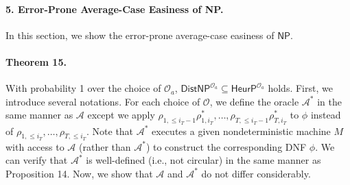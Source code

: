 \documentclass[10pt,a4paper]{article}
\begin{document}
\paragraph{5. Error-Prone Average-Case Easiness of NP.}
In this section, we show the error-prone average-case easiness of $\mathsf{NP}$.
\paragraph{Theorem 15.}
With probability 1 over the choice of $\mathcal O_a$, $\mathsf{DistNP}^{\mathcal O_a}\subseteq\mathsf{HeurP}^{\mathcal O_a}$ holds.
First, we introduce several notations. For each choice of $\mathcal O$, we define the oracle $\mathcal A^*$ in the same manner as $\mathcal A$ except we apply $\rho_{1,\leq i_T-1}\rho^*_{1,i_T},\ldots,\rho_{T,\leq i_T-1}\rho^*_{T,i_T}$ to $\phi$ instead of $\rho_{1,\leq i_T},\ldots,\rho_{T,\leq i_T}$. Note that $\mathcal A^*$ executes a given nondeterministic machine $M$ with access to $\mathcal A$ (rather than $\mathcal A^*$) to construct the corresponding DNF $\phi$. We can verify that $\mathcal A^*$ is well-defined (i.e., not circular) in the same manner as Proposition 14.
Now, we show that $\mathcal A$ and $\mathcal A^*$ do not differ considerably.
\end{document}
